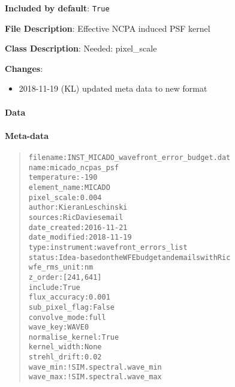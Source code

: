 \textbf{Included by default}: \texttt{True}

\textbf{File Description}: Effective NCPA induced PSF kernel

\textbf{Class Description}: Needed: pixel\_scale

\textbf{Changes}:

\begin{itemize}
\item 2018-11-19 (KL) updated meta data to new format
\end{itemize}


\paragraph{Data%
  \label{id3}%
}


\paragraph{Meta-data%
  \label{id4}%
}

\begin{quote}
\begin{alltt}
        filename : INST_MICADO_wavefront_error_budget.dat
            name : micado_ncpas_psf
     temperature : -190
    element_name : MICADO
     pixel_scale : 0.004
          author : Kieran Leschinski
         sources : Ric Davies email
    date_created : 2016-11-21
   date_modified : 2018-11-19
            type : instrument:wavefront_errors_list
          status : Idea - based on the WFE budget and emails with Ric
    wfe_rms_unit : nm
         z_order : [241, 641]
         include : True
   flux_accuracy : 0.001
  sub_pixel_flag : False
   convolve_mode : full
        wave_key : WAVE0
normalise_kernel : True
    kernel_width : None
    strehl_drift : 0.02
        wave_min : !SIM.spectral.wave_min
        wave_max : !SIM.spectral.wave_max
\end{alltt}
\end{quote}
